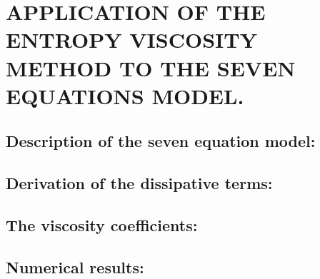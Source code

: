%
%
%


\chapter{\uppercase {Application of the entropy viscosity method to the seven equations model.}}
\section{Description of the seven equation model:}
\section{Derivation of the dissipative terms:}
\section{The viscosity coefficients:}
\section{Numerical results:}
